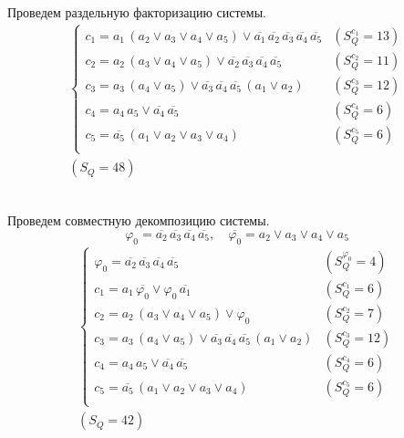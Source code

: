 \documentclass{article}
\begin{document}
\noindent\begin{minipage}{\textwidth}
Проведем раздельную факторизацию системы.
\[\begin{matrix}
    \begin{cases}
        c_1 = a_1\,\left(a_2 \lor a_3 \lor a_4 \lor a_5\right) \lor \overline{a_1}\,\overline{a_2}\,\overline{a_3}\,\overline{a_4}\,\overline{a_5} & (S_Q^{c_1} = 13) \\
        c_2 = a_2\,\left(a_3 \lor a_4 \lor a_5\right) \lor \overline{a_2}\,\overline{a_3}\,\overline{a_4}\,\overline{a_5} & (S_Q^{c_2} = 11) \\
        c_3 = a_3\,\left(a_4 \lor a_5\right) \lor \overline{a_3}\,\overline{a_4}\,\overline{a_5}\,\left(a_1 \lor a_2\right) & (S_Q^{c_3} = 12) \\
        c_4 = a_4\,a_5 \lor \overline{a_4}\,\overline{a_5} & (S_Q^{c_4} = 6) \\
        c_5 = \overline{a_5}\,\left(a_1 \lor a_2 \lor a_3 \lor a_4\right) & (S_Q^{c_5} = 6) \\
    \end{cases} \\ (S_Q = 48)
\end{matrix}\] \\ \phantom{0}
\end{minipage}
\noindent\begin{minipage}{\textwidth}
Проведем совместную декомпозицию системы. \[\varphi_{0} = \overline{a_2}\,\overline{a_3}\,\overline{a_4}\,\overline{a_5}, \quad \overline{\varphi_{0}} = a_2 \lor a_3 \lor a_4 \lor a_5\]
\[\begin{matrix}
    \begin{cases}
        \varphi_{0} = \overline{a_2}\,\overline{a_3}\,\overline{a_4}\,\overline{a_5} & (S_Q^{\varphi_{0}} = 4) \\
        c_1 = a_1\,\overline{\varphi_{0}} \lor \varphi_{0}\,\overline{a_1} & (S_Q^{c_1} = 6) \\
        c_2 = a_2\,\left(a_3 \lor a_4 \lor a_5\right) \lor \varphi_{0} & (S_Q^{c_2} = 7) \\
        c_3 = a_3\,\left(a_4 \lor a_5\right) \lor \overline{a_3}\,\overline{a_4}\,\overline{a_5}\,\left(a_1 \lor a_2\right) & (S_Q^{c_3} = 12) \\
        c_4 = a_4\,a_5 \lor \overline{a_4}\,\overline{a_5} & (S_Q^{c_4} = 6) \\
        c_5 = \overline{a_5}\,\left(a_1 \lor a_2 \lor a_3 \lor a_4\right) & (S_Q^{c_5} = 6) \\
    \end{cases} \\ (S_Q = 42)
\end{matrix}\] \\ \phantom{0}
\end{minipage}
\end{document}
